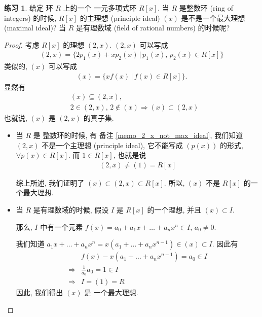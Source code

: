 \documentclass[utf8]{ctexbook}
\theoremstyle{definition}
\newtheorem{exercise}{练习}[section]
\begin{document}
\begin{exercise}
给定 环 $R$ 上的一个 一元多项式环 $R[x]$. 当 $R$ 是整数环 (ring of integers) 的时候, $R[x]$ 的主理想 (principle ideal) $(x)$ 是不是一个最大理想 (maximal ideal)? 当 $R$ 是有理数域 (field of rational numbers) 的时候呢?
\end{exercise}

\begin{proof}
考虑 $R[x]$ 的理想 $(2,x)$. $(2,x)$ 可以写成
\begin{align*}
(2,x) = \{  2 p_1 (x) + x p_2 (x) \, | \,  p_1 (x), \, p_2(x) \in R[x] \}
\end{align*}
类似的, $(x)$ 可以写成
\begin{align*}
(x) = \{ x f(x) \, | \,  f(x) \in R[x] \} .
\end{align*}
显然有
\begin{align*}
& (x) \subseteq (2,x), \\
& 2 \in (2, x), \, 2 \not \in (x) \Longrightarrow (x) \subset (2,x)
\end{align*}
也就说, $(x)$ 是 $(2,x)$ 的真子集.

\begin{itemize}
\item{当 $R$ 是 整数环的时候, 有 备注 \ref{memo_2_x_not_max_ideal}, 我们知道 $(2,x)$ 不是一个主理想 (principle ideal), 它不能写成 $(p(x))$ 的形式, $\forall p(x) \in R[x]$. 而 $1 \in R[x]$, 也就是说
\begin{align*}
(2, x) \neq (1) = R[x]
\end{align*}

综上所述, 我们证明了 $(x) \subset (2,x) \subset R[x]$. 所以, $(x)$ 不是 $R[x]$ 的一个最大理想.
}
\item{当 $R$ 是有理数域的时候, 假设 $I$ 是 $R[x]$ 的一个理想, 并且 $(x) \subset I$. 

那么, $I$ 中有一个元素 $f(x) = a_0 + a_1 x + \ldots + a_n x^n \in I$, $a_0 \neq 0$. 

我们知道 $a_1 x + \ldots + a_n x^n = x (a_1 + \ldots + a_n x^{n-1}  ) \in (x) \subset I$. 因此有
\begin{align*}
& f(x) - x (a_1 + \ldots + a_n x^{n-1}  ) = a_0 \in I \\
 \Longrightarrow & \frac{1}{a_0} a_0 = 1 \in I \\
 \Longrightarrow & I = (1) = R
\end{align*}
因此, 我们得出 $(x) $ 是 一个最大理想.
}
\end{itemize}
\end{proof}
\end{document}
